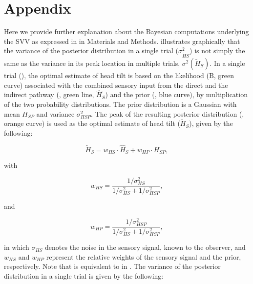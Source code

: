 
\section{Appendix}
\label{p1:sec:appendix}

Here we provide further explanation about the Bayesian computations underlying the SVV as expressed in  in Materials and Methods.  illustrates graphically that the variance of the posterior distribution in a single trial ($\sigma^2_{\tilde{H}S}$) is not simply the same as the variance in its peak location in multiple trials, $\sigma^2(\tilde{H}_S)$. In a single trial (), the optimal estimate of head tilt is based on the likelihood (B, green curve) associated with the combined sensory input from the direct and the indirect pathway (, green line, $\hat{H}_S$) and the prior (, blue curve), by multiplication of the two probability distributions. The prior distribution is a Gaussian with mean $H_{SP}$ and variance $\sigma^2_{HSP}$. The peak of the resulting posterior distribution (, orange curve) is used as the optimal estimate of head tilt ($\tilde{H}_S$), given by the following: 

\begin{equation}
\label{p1:eqn13}
\tilde{H}_S = w_{HS} \cdot \hat{H}_S + w_{HP} \cdot H_{SP},
\end{equation}

with

\begin{equation}
\label{p1:eqn14}
w_{HS} = \frac{1 / \sigma^2_{HS}}{1 / \sigma^2_{HS} + 1 / \sigma^2_{HSP}},
\end{equation}

and

\begin{equation}
\label{p1:eqn15}
w_{HP} = \frac{1 / \sigma^2_{HSP}}{1 / \sigma^2_{HS} + 1 / \sigma^2_{HSP}},
\end{equation}

in which $\sigma_{HS}$ denotes the noise in the sensory signal, known to the observer, and $w_{HS}$ and $w_{HP}$ represent the relative weights of the sensory signal and the prior, respectively. Note that  is equivalent to  in . The variance of the posterior distribution in a single trial is given by the following: 

